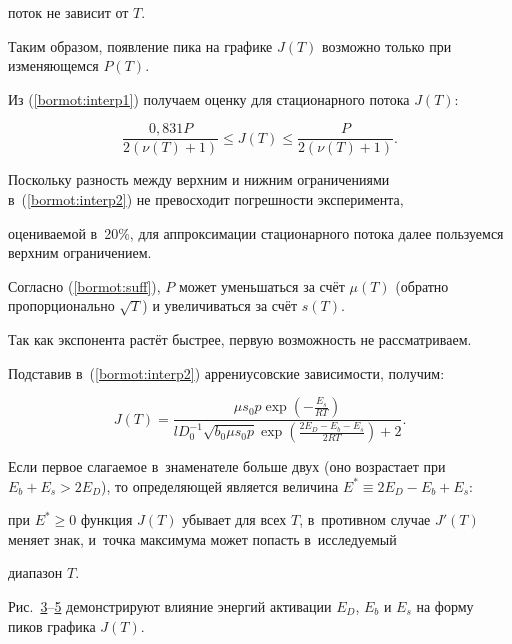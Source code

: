 поток не зависит от $T$.

Таким образом, появление пика на графике $J(T)$ возможно только при изменяющемся $P(T)$.



Из (\ref{bormot:interp1}) получаем оценку для стационарного потока $J(T)$:

\begin{equation}

\label{bormot:interp2}

\frac{0,831P}{2(\nu(T)+1)} \le J(T)\le \frac{P}{2(\nu(T)+1)}.

\end{equation}



Поскольку разность между верхним и нижним ограничениями в~(\ref{bormot:interp2}) не превосходит погрешности эксперимента,

оцениваемой в~20\%, для аппроксимации стационарного потока далее пользуемся верхним ограничением.

Согласно (\ref{bormot:suff}), $P$ может уменьшаться за счёт $\mu(T)$ (обратно пропорционально $\sqrt{T}$) и увеличиваться за счёт  $s(T)$.

Так как экспонента растёт быстрее, первую возможность не рассматриваем.

Подставив в~(\ref{bormot:interp2}) аррениусовские зависимости, получим:

\begin{equation*}

J(T)=\frac{\mu s_{0} p\exp(-\frac{E_{s}}{RT})}{l  D_0^{-1}\sqrt{b_0\mu s_{0} p}\exp(\frac{2E_D-E_b-E_s}{2RT})+2}.

\end{equation*}





\noindent

Если первое слагаемое в~знаменателе больше двух (оно возрастает при $E_b+E_s>2E_D$), то определяющей является величина $E^{*}\equiv2E_D-E_b+E_s$:

при $E^{*}\geq0$ функция $J(T)$ убывает для всех $T$, в~противном случае $J'(T)$ меняет знак, и~точка максимума может попасть в~исследуемый

диапазон $T$.

Рис.~\hyperlink{bormota:3}{3}--\hyperlink{bormota:5}{5} демонстрируют влияние энергий активации $E_D$, $E_b$ и $E_s$ на форму пиков графика $J(T)$.





